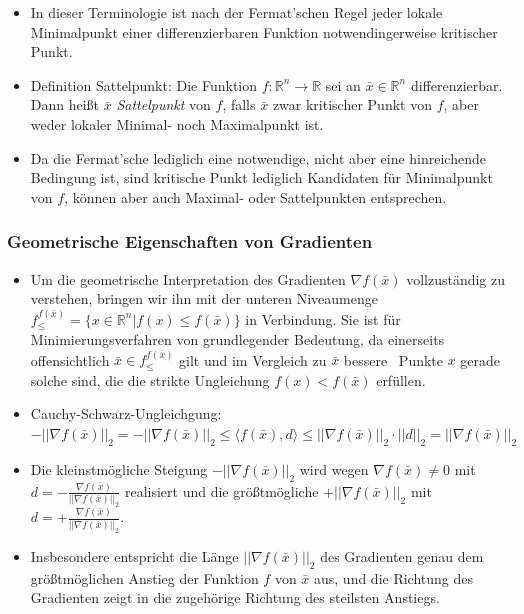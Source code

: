 \documentclass[paper=a4, fontsize=11pt]{scrartcl} %
\numberwithin{equation}{section} %
\numberwithin{figure}{section} %
\numberwithin{table}{section} %
\begin{document}
\begin{itemize}
\item In dieser Terminologie ist nach der Fermat'schen Regel jeder lokale Minimalpunkt einer differenzierbaren Funktion notwendingerweise kritischer Punkt.
\item Definition Sattelpunkt: Die Funktion $f: \mathbb{R}^n \rightarrow \mathbb{R}$ sei an $\bar{x} \in \mathbb{R}^n$ differenzierbar. Dann heißt $\bar{x}$ \textit{Sattelpunkt} von $f$, falls $\bar{x}$ zwar kritischer Punkt von $f$, aber weder lokaler Minimal- noch Maximalpunkt ist.
\item Da die Fermat'sche lediglich eine notwendige, nicht aber eine hinreichende Bedingung ist, sind kritische Punkt lediglich Kandidaten für Minimalpunkt von $f$, können aber auch Maximal- oder Sattelpunkten entsprechen.
\end{itemize}

\subsubsection{Geometrische Eigenschaften von Gradienten}

\begin{itemize}
\item Um die geometrische Interpretation des Gradienten $\nabla f(\bar{x})$ vollzuständig zu verstehen, bringen wir ihn mit der unteren Niveaumenge $f^{f(\bar{x})}_\le = \{ x \in \mathbb{R}^n | f(x) \le f(\bar{x}) \}$ in Verbindung. Sie ist für Minimierungsverfahren von grundlegender Bedeutung, da einerseits offensichtlich $\bar{x} \in f^{f(\bar{x})}_\le$ gilt und im Vergleich zu $\bar{x}$ \glqq bessere \grqq\ Punkte $x$ gerade solche sind, die die strikte Ungleichung $f(x) < f(\bar{x})$ erfüllen.
\item Cauchy-Schwarz-Ungleichgung: $- ||\nabla f(\bar{x})||_2 = - || \nabla f(\bar{x}) ||_2 \le \langle f(\bar{x}),d \rangle \le ||\nabla f(\bar{x}) ||_2 \cdot ||d||_2 = ||\nabla f(\bar{x}) ||_2$
\item Die kleinstmögliche Steigung $-||\nabla f(\bar{x})||_2$ wird wegen $\nabla f(\bar{x}) \neq 0$ mit $d = - \frac{\nabla f(\bar{x})}{||\nabla f(\bar{x})||_2}$ realisiert und die größtmögliche $+ ||\nabla f(\bar{x})||_2$ mit $d = + \frac{\nabla f(\bar{x})}{||\nabla f(\bar{x})||_2}$.
\item Insbesondere entspricht die Länge $||\nabla f(\bar{x})||_2$ des Gradienten genau dem größtmöglichen Anstieg der Funktion $f$ von $\bar{x}$ aus, und die Richtung des Gradienten zeigt in die zugehörige Richtung des steilsten Anstiegs.
\end{itemize}
\end{document}
